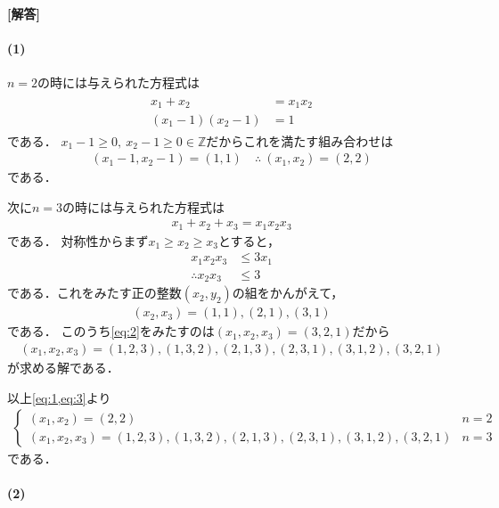 \documentclass[../../main.tex]{subfiles}
\begin{document}
\begin{oframed}
  
\end{oframed}

{\bf [解答]}
\paragraph{(1)}

$n=2$の時には与えられた方程式は
\begin{align}
  \begin{split}
    x_1+x_2&=x_1x_2 \\
    (x_1-1)(x_2-1)&=1
  \end{split}
\end{align}
である．
$x_1-1\ge0,\ x_2-1\ge0\in\mathbb{Z}$だからこれを満たす組み合わせは
\begin{align}
  (x_1-1,x_2-1)=(1,1) \quad\therefore\ (x_1,x_2)=(2,2) \label{eq:1}
\end{align}
である．

次に$n=3$の時には与えられた方程式は
\begin{align}
  x_1+x_2+x_3=x_1x_2x_3 \label{eq:2}
\end{align}
である．
対称性からまず$x_1\ge x_2\ge x_3$とすると，
\begin{align}
  x_1x_2x_3&\le3x_1 \\
  \therefore
  x_2x_3&\le3
\end{align}
である．これをみたす正の整数$(x_2,y_2)$の組をかんがえて，
\begin{align}
  (x_2,x_3)=(1,1),(2,1),(3,1)
\end{align}
である．
このうち\cref{eq:2}をみたすのは$(x_1,x_2,x_3)=(3,2,1)$だから
\begin{align}
  (x_1,x_2,x_3)=(1,2,3),(1,3,2),(2,1,3),(2,3,1),(3,1,2),(3,2,1) \label{eq:3}
\end{align}
が求める解である．

以上\cref{eq:1,eq:3}より
\begin{align}
  \begin{cases}
    (x_1,x_2)=(2,2) & n=2 \\
    (x_1,x_2,x_3)=(1,2,3),(1,3,2),(2,1,3),(2,3,1),(3,1,2),(3,2,1) & n=3
  \end{cases}
\end{align}
である．

\paragraph{(2)}
\end{document}
